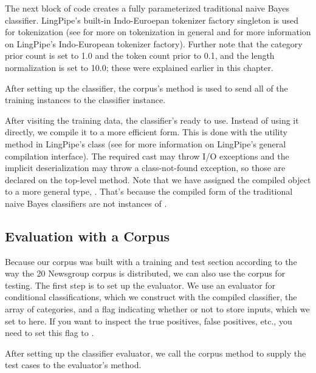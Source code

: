 The next block of code creates a fully parameterized traditional
naive Bayes classifier.
%
%
LingPipe's built-in Indo-Euroepan tokenizer factory singleton is used
for tokenization (see  for more on tokenization
in general and  for more information on
LingPipe's Indo-European tokenizer factory).  Further note that the
category prior count is set to 1.0 and the token count prior to 0.1,
and the length normalization is set to 10.0; these were explained
earlier in this chapter.

After setting up the classifier, the corpus's 
method is used to send all of the training instances to the
classifier instance.  

After visiting the training data, the classifier's ready to use.
Instead of using it directly, we compile it to a more efficient form.
This is done with the utility method  in LingPipe's
 class (see  for
more information on LingPipe's general compilation interface).  The
required cast may throw I/O exceptions and the implicit
deserialization may throw a class-not-found exception, so those are
declared on the top-level  method.  Note that we have
assigned the compiled object to a more general type,
.  That's because the compiled form of the
traditional naive Bayes classifiers are not instances of
.

\subsection{Evaluation with a Corpus}\label{section:naive-bayes-corpus-eval}

Because our corpus was built with a training and test section
according to the way the 20 Newsgroup corpus is distributed, we can
also use the corpus for testing.  The first step is to set up the
evaluator.  
%
%
We use an evaluator for conditional classifications, which
we construct with the compiled classifier, the array of categories, and
a flag indicating whether or not to store inputs, which we set to
 here.  If you want to inspect the true positives, false
positives, etc., you need to set this flag to .  

After setting up the classifier evaluator, we call the corpus
method  to supply the test cases to the 
evaluator's  method.  

